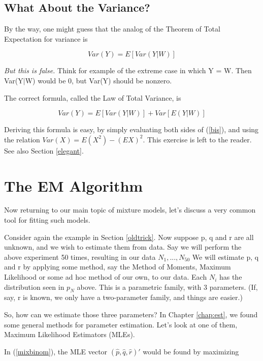 \documentclass[11pt]{article}
\begin{document}
\subsection{What About the Variance?}
\label{totalvar}

By the way, one might guess that the analog of the Theorem of Total Expectation
for variance is

\begin{equation}
Var(Y)=E[Var(Y|W)]
\end{equation}

\textit{But this is false.} Think for example of the extreme case in which Y
= W. Then Var(Y$|$W) would be 0, but Var(Y) should be nonzero.

The correct formula, called the Law of Total Variance, is

\begin{equation}
\label{bis}
Var(Y)=E[Var(Y|W)]+Var[E(Y|W)]
\end{equation}

Deriving this formula is easy, by simply evaluating both sides of
(\ref{bis}), and using the relation $Var(X) = E(X^2) -(EX)^2$. This
exercise is left to the reader.  See also Section \ref{elegant}.

\section{The EM Algorithm}
\label{emalg}

Now returning to our main topic of mixture models, let's discuss a very
common tool for fitting such models.

Consider again the example in Section \ref{oldtrick}.  Now suppose p, q
and r are all unknown, and we wish to estimate them from data. Say we
will perform the above experiment 50 times, resulting in our data
$N_1,...,N_{50}$ We will estimate p, q and r by applying some method,
say the Method of Moments, Maximum Likelihood or some ad hoc method of
our own, to our data. Each $N_i$ has the distribution seen in $p_N$
above. This is a parametric family, with 3 parameters. (If, say, r is
known, we only have a two-parameter family, and things are easier.)

So, how can we estimate those three parameters?  In Chapter
\ref{chap:est}, we found some general methods for parameter estimation.
Let's look at one of them, Maximum Likelihood Estimators (MLEs).

In (\ref{mixbinom}), the MLE vector 
$(\widehat{p},
  \widehat{q},
  \widehat{r})'$
would be found by maximizing
\end{document}
